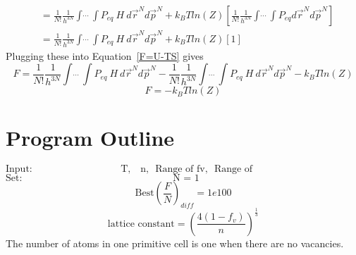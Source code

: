\documentclass[double,12pt]{beavtex}
\begin{document}
\begin{align}   
    &= \frac{1}{N!}\frac{1}{h^{3N}}\int\dot~\dot~\dot~\int P_{eq}~H~d\vec r^{N} d\vec p^{N} +k_BTln(Z)\left[\frac{1}{N!}\frac{1}{h^{3N}}\int\dot~\dot~\dot~\int P_{eq}d\vec r^{N} d\vec p^{N}\right]  \nonumber \\
    &= \frac{1}{N!}\frac{1}{h^{3N}}\int\dot~\dot~\dot~\int P_{eq}~H~d\vec r^{N} d\vec p^{N} +k_BTln(Z)\left[1\right]   
\end{align}
Plugging these into Equation~\ref{F=U-TS} gives
\begin{equation} F = \frac{1}{N!}\frac{1}{h^{3N}}\int\dot~\dot~\dot~\int P_{eq}~H~d\vec r^{N} d\vec p^{N}-\frac{1}{N!}\frac{1}{h^{3N}}\int\dot~\dot~\dot~\int P_{eq}~H~d\vec r^{N} d\vec p^{N} -k_BTln(Z)\end{equation}
\begin{equation}F = -k_BTln(Z)\end{equation}


\section{Program Outline}

\begin{displaymath}\text{Input:~~~~~~~~~~~~~~~~~~~~~~~~~~~T,~~ n,~~Range of fv,~~Range of gw~~~~~~~~~~~~~~~~~~~~~~~~~~~~~~~~~~~}\end{displaymath} 
\begin{displaymath}\text{Set:~~~~~~~~~~~~~~~~~~~~~~~~~~~~~~~~~~~~~~~~~~~~~~N~=~1~~~~~~~~~~~~~~~~~~~~~~~~~~~~~~~~~~~~~~~~~~~~~~~~~~~~}\end{displaymath} 
\begin{displaymath}\text{Best}\left(\frac{F}{N}\right)_{diff}= 1e100\end{displaymath}
\begin{displaymath}\text{lattice constant}=\left(\frac{4(1-f_v)}{n}\right)^{\frac{1}{3}}\end{displaymath}
The number of atoms in one primitive cell is one when there are no vacancies. 
\end{document}
